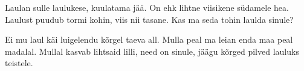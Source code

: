 Laulan sulle laulukese, kuulatama j\"a\"a.
On ehk lihtne viisikene s\"udamele hea.
Laulust puudub tormi kohin, viis nii tasane.
Kas ma seda tohin laulda sinule?

Ei mu laul k\"ai luigelendu k\~orgel taeva all.
Mulla peal ma leian enda maa peal madalal.
Mullal kasvab lihtsaid lilli, need on sinule,
j\"a\"agu k\~orged pilved lauluks teistele.